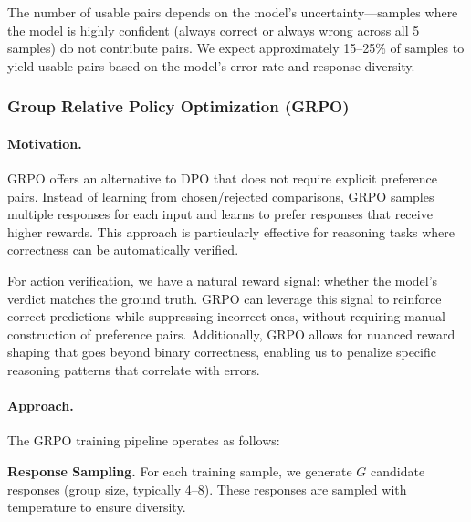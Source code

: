 \documentclass[11pt,a4paper]{article}
\begin{document}
The number of usable pairs depends on the model's uncertainty---samples where the model is highly confident (always correct or always wrong across all 5 samples) do not contribute pairs. We expect approximately 15--25\% of samples to yield usable pairs based on the model's error rate and response diversity.

\subsubsection{Group Relative Policy Optimization (GRPO)}

\paragraph{Motivation.} GRPO offers an alternative to DPO that does not require explicit preference pairs. Instead of learning from chosen/rejected comparisons, GRPO samples multiple responses for each input and learns to prefer responses that receive higher rewards. This approach is particularly effective for reasoning tasks where correctness can be automatically verified.

For action verification, we have a natural reward signal: whether the model's verdict matches the ground truth. GRPO can leverage this signal to reinforce correct predictions while suppressing incorrect ones, without requiring manual construction of preference pairs. Additionally, GRPO allows for nuanced reward shaping that goes beyond binary correctness, enabling us to penalize specific reasoning patterns that correlate with errors.

\paragraph{Approach.} The GRPO training pipeline operates as follows:

\textbf{Response Sampling.} For each training sample, we generate $G$ candidate responses (group size, typically 4--8). These responses are sampled with temperature to ensure diversity.
\end{document}
